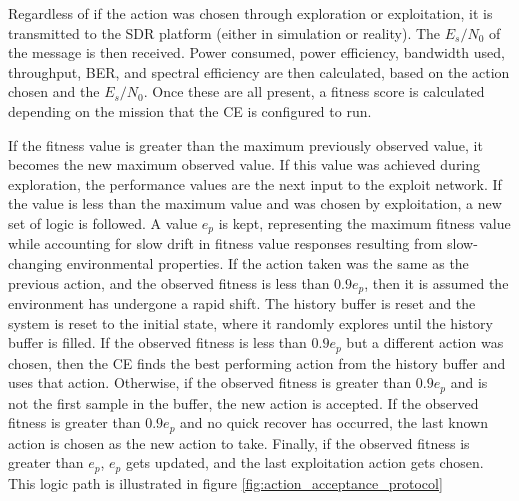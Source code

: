 \par Regardless of if the action was chosen through exploration or exploitation, it is transmitted to the SDR platform (either in simulation or reality). The $E_s/N_0$ of the message is then received.  Power consumed, power efficiency, bandwidth used, throughput, BER, and spectral efficiency are then calculated, based on the action chosen and the $E_s/N_0$. Once these are all present, a fitness score is calculated depending on the mission that the CE is configured to run. 
\par If the fitness value is greater than the maximum previously observed value, it becomes the new maximum observed value. If this value was achieved during exploration, the performance values are the next input to the exploit network. If the value is less than the maximum value and was chosen by exploitation, a new set of logic is followed. A value $e_p$ is kept, representing the maximum fitness value while accounting for slow drift in fitness value responses resulting from slow-changing environmental properties. If the action taken was the same as the previous action, and the observed fitness is less than $0.9 e_p$, then it is assumed the environment has undergone a rapid shift. The history buffer is reset and the system is reset to the initial state, where it randomly explores until the history buffer is filled.  If the observed fitness is less than $0.9 e_p$ but a different action was chosen, then the CE finds the best performing action from the history buffer and uses that action. Otherwise, if the observed fitness is greater than $0.9 e_p$ and is not the first sample in the buffer, the new action is accepted. If the observed fitness is greater than $0.9 e_p$ and no quick recover has occurred, the last known action is chosen as the new action to take. Finally, if the observed fitness is greater than $e_p$, $e_p$ gets updated, and the last exploitation action gets chosen. This logic path is illustrated in figure \ref{fig:action_acceptance_protocol} 


